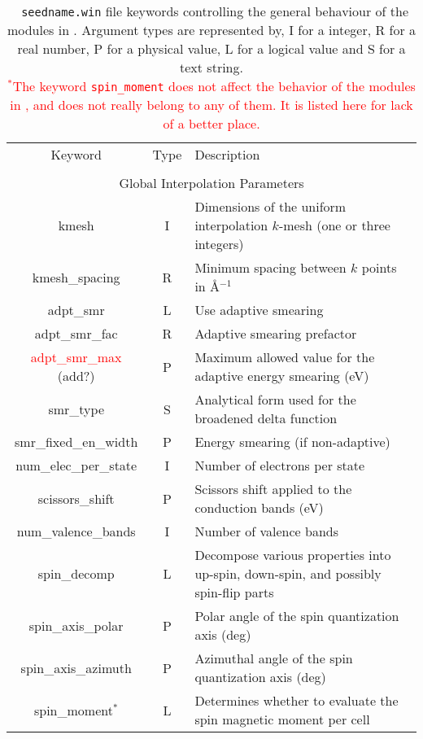 \clearpage

\begin{table}[hH!]
\begin{center}
\begin{tabular}{|c|c|p{6cm}|}
  \hline
  Keyword & Type & Description \\
  &      &             \\
  \hline\hline
  \multicolumn{3}{|c|}{Global Interpolation Parameters} \\
  \hline
  {\sc kmesh}   & I & Dimensions of the uniform interpolation $k$-mesh 
(one or three integers) \\
  {\sc kmesh\_spacing}& R & Minimum spacing between $k$ points in \AA$^{-1}$\\
  {\sc adpt\_smr}   & L & Use adaptive smearing\\
  {\sc adpt\_smr\_fac}   & R & Adaptive smearing prefactor\\
  {\sc \textcolor{red}{adpt\_smr\_max} (add?)} & P & Maximum allowed value for the adaptive energy smearing (eV) \\  {\sc smr\_type}   & S &  Analytical form used for the broadened delta function\\
  {\sc smr\_fixed\_en\_width}   & P & Energy smearing (if non-adaptive)\\
  {\sc num\_elec\_per\_state}   & I & Number of electrons per state \\
  {\sc scissors\_shift}   & P & Scissors shift applied to the conduction bands (eV) \\
  {\sc num\_valence\_bands}   & I & Number of valence bands \\
  {\sc spin\_decomp}& L & Decompose various properties into
  up-spin, down-spin, and possibly spin-flip parts\\
  {\sc spin\_axis\_polar}& P & Polar angle of the spin quantization axis (deg)\\
  {\sc spin\_axis\_azimuth}& P & Azimuthal angle of the spin quantization axis (deg)\\
  {\sc spin\_moment}$^*$& L & Determines whether to evaluate the spin 
magnetic moment per cell\\  \hline
\end{tabular}
\caption[Parameter file keywords controlling \postw.]  {{\tt
    seedname.win} file keywords controlling the general behaviour of
  the modules in \postw. Argument types are represented by, I for a
  integer, R for a real number, P for a
  physical value, L for a logical value and S for a text string.\\
  \textcolor{red}{$^*$The keyword {\tt spin\_moment} does not affect
    the behavior of the modules in \postw, and does not really belong
    to any of them. It is listed here for lack of a better place.}}
\label{parameter_keywords_postw90}
\end{center}
\end{table}


